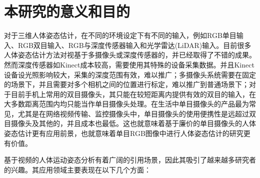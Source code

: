 \section{本研究的意义和目的}

对于三维人体姿态估计，在不同的环境设定下有不同的输入，例如RGB单目输入、RGB双目输入、RGB与深度传感器输入和光学雷达(LiDAR)输入。目前很多人体姿态估计方法对视基于多摄像头或深度传感器的，并已经取得了不错的成果。然而深度传感器如Kinect\cite{kinect}成本较高，需要使用其特殊的设备采集数据。并且Kinect设备设光照影响较大，采集的深度范围有效，难以推广；多摄像头系统需要在固定的场景下，并且需要对多个相机之间的位置进行标定，难以推广到普通场景下；对于目前手机上常用的双目摄像头，其只能在较短距离内提供有效的双目的输入，在大多数距离范围内均只能当作单目摄像头处理。在生活中单目摄像头的产品最为常见，尤其是在网络视频传输、监控摄像头中，单目摄像头的使用便携性是远超过双目摄像头及其他的，并且成本也最低。这也就意味着基于廉价的单目摄像头的人体姿态估计更有应用前景，也就意味着单目RGB图像中进行人体姿态估计的研究更有价值。

基于视频的人体运动姿态分析有着广阔的引用场景，因此其吸引了越来越多研究者的兴趣。其应用领域主要表现在以下几个方面：

